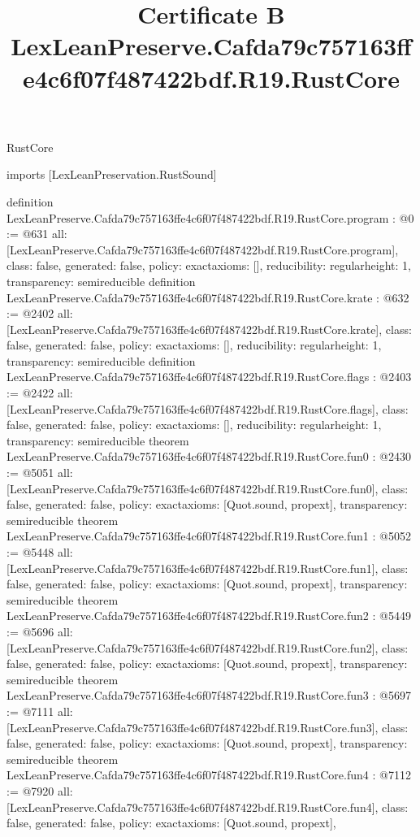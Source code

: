 \begin{lexlean}{RustCore}
\title{Certificate B LexLeanPreserve.Cafda79c757163ffe4c6f07f487422bdf.R19.RustCore}
\begin{coremodule}
imports [LexLeanPreservation.RustSound]

definition LexLeanPreserve.Cafda79c757163ffe4c6f07f487422bdf.R19.RustCore.program : @0 := @631 {
  all: [LexLeanPreserve.Cafda79c757163ffe4c6f07f487422bdf.R19.RustCore.program],
  class: false,
  generated: false,
  policy: exact{axioms: []},
  reducibility: regular{height: 1},
  transparency: semireducible
}
definition LexLeanPreserve.Cafda79c757163ffe4c6f07f487422bdf.R19.RustCore.krate : @632 := @2402 {
  all: [LexLeanPreserve.Cafda79c757163ffe4c6f07f487422bdf.R19.RustCore.krate],
  class: false,
  generated: false,
  policy: exact{axioms: []},
  reducibility: regular{height: 1},
  transparency: semireducible
}
definition LexLeanPreserve.Cafda79c757163ffe4c6f07f487422bdf.R19.RustCore.flags : @2403 := @2422 {
  all: [LexLeanPreserve.Cafda79c757163ffe4c6f07f487422bdf.R19.RustCore.flags],
  class: false,
  generated: false,
  policy: exact{axioms: []},
  reducibility: regular{height: 1},
  transparency: semireducible
}
theorem LexLeanPreserve.Cafda79c757163ffe4c6f07f487422bdf.R19.RustCore.fun0 : @2430 := @5051 {
  all: [LexLeanPreserve.Cafda79c757163ffe4c6f07f487422bdf.R19.RustCore.fun0],
  class: false,
  generated: false,
  policy: exact{axioms: [Quot.sound, propext]},
  transparency: semireducible
}
theorem LexLeanPreserve.Cafda79c757163ffe4c6f07f487422bdf.R19.RustCore.fun1 : @5052 := @5448 {
  all: [LexLeanPreserve.Cafda79c757163ffe4c6f07f487422bdf.R19.RustCore.fun1],
  class: false,
  generated: false,
  policy: exact{axioms: [Quot.sound, propext]},
  transparency: semireducible
}
theorem LexLeanPreserve.Cafda79c757163ffe4c6f07f487422bdf.R19.RustCore.fun2 : @5449 := @5696 {
  all: [LexLeanPreserve.Cafda79c757163ffe4c6f07f487422bdf.R19.RustCore.fun2],
  class: false,
  generated: false,
  policy: exact{axioms: [Quot.sound, propext]},
  transparency: semireducible
}
theorem LexLeanPreserve.Cafda79c757163ffe4c6f07f487422bdf.R19.RustCore.fun3 : @5697 := @7111 {
  all: [LexLeanPreserve.Cafda79c757163ffe4c6f07f487422bdf.R19.RustCore.fun3],
  class: false,
  generated: false,
  policy: exact{axioms: [Quot.sound, propext]},
  transparency: semireducible
}
theorem LexLeanPreserve.Cafda79c757163ffe4c6f07f487422bdf.R19.RustCore.fun4 : @7112 := @7920 {
  all: [LexLeanPreserve.Cafda79c757163ffe4c6f07f487422bdf.R19.RustCore.fun4],
  class: false,
  generated: false,
  policy: exact{axioms: [Quot.sound, propext]},
}
\end{coremodule}
\end{lexlean}
